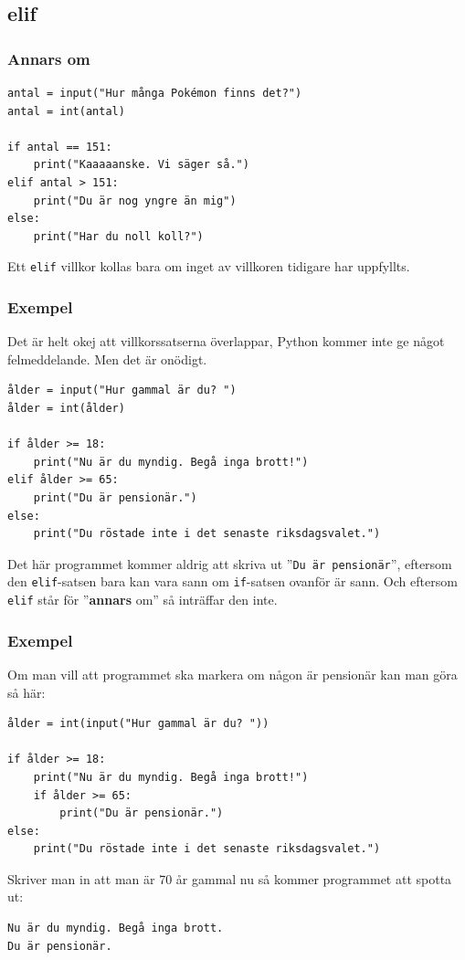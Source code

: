 \documentclass[aspectratio=169]{beamer}
\begin{document}
\subsection{elif}

\begin{frame}[fragile]
	\frametitle{Annars om}
	
	\begin{lstlisting}
antal = input("Hur många Pokémon finns det?")
antal = int(antal)

if antal == 151:
    print("Kaaaaanske. Vi säger så.")
elif antal > 151:
    print("Du är nog yngre än mig")
else:
    print("Har du noll koll?")
	\end{lstlisting}
	
	Ett \lstinline{elif} villkor kollas bara om inget av villkoren tidigare har uppfyllts. 


\end{frame}

\begin{frame}[fragile]
	\frametitle{Exempel}

	Det är helt okej att villkorssatserna överlappar, Python kommer inte ge något felmeddelande. Men det är onödigt.
	
	\begin{lstlisting}
ålder = input("Hur gammal är du? ")
ålder = int(ålder)

if ålder >= 18:
    print("Nu är du myndig. Begå inga brott!")
elif ålder >= 65:
    print("Du är pensionär.")
else:
    print("Du röstade inte i det senaste riksdagsvalet.")
	\end{lstlisting}

	\pause
	
	Det här programmet kommer aldrig att skriva ut ''\texttt{Du är pensionär}'', eftersom den \lstinline{elif}-satsen bara kan vara sann om \lstinline{if}-satsen ovanför är sann. Och eftersom \lstinline{elif} står för ''\textbf{annars} om'' så inträffar den inte.

\end{frame}

\begin{frame}[fragile]
	\frametitle{Exempel}
	
	Om man vill att programmet ska markera om någon är pensionär kan man göra så här:
	
	\begin{lstlisting}
ålder = int(input("Hur gammal är du? "))

if ålder >= 18:
    print("Nu är du myndig. Begå inga brott!")
    if ålder >= 65:
        print("Du är pensionär.")
else:
    print("Du röstade inte i det senaste riksdagsvalet.")
	\end{lstlisting}
	
	Skriver man in att man är 70 år gammal nu så kommer programmet att spotta ut:
	
	\begin{lstlisting}
Nu är du myndig. Begå inga brott.
Du är pensionär.
	\end{lstlisting}

\end{frame}
\end{document}
